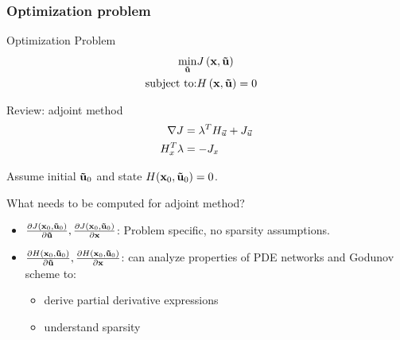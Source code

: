\begin{frame}[t]\frametitle{Optimization problem}
    

\begin{block}{Optimization Problem}
\begin{align}
\underset{\mathbf{\vec{u}}}{\min}&J\left(\mathbf{x},\mathbf{\vec{u}}\right)&\\\text{subject to:}&H\left(\mathbf{x},\mathbf{\vec{u}}\right)=0&
\end{align}
\end{block}

\begin{block}{Review: adjoint method}
\begin{align}
\nabla J & = \lambda^T H_{\vec{u}} + J_{\vec{u}} \\
H_{x}^T \lambda & = -J_{x}
\end{align}


\end{block}


\end{frame}

\begin{frame}


Assume initial $\mathbf{\vec{u}}_0$ and state $H(\mathbf{x}_0, \mathbf{\vec{u}}_0)=0$.
\begin{block}{What needs to be computed for adjoint method?}
\begin{itemize}
    \item $\frac{\partial J(\mathbf{x}_0, \mathbf{\vec{u}}_0)}{\partial\mathbf{\vec{u}}}, \frac{\partial J(\mathbf{x}_0, \mathbf{\vec{u}}_0)}{\partial\mathbf{x}}$: Problem specific, no sparsity assumptions.
    \item $\frac{\partial H(\mathbf{x}_0, \mathbf{\vec{u}}_0)}{\partial\mathbf{\vec{u}}}, \frac{\partial H(\mathbf{x}_0, \mathbf{\vec{u}}_0)}{\partial\mathbf{x}}$: can analyze properties of PDE networks and Godunov scheme to:
    \begin{itemize}
        \item derive partial derivative expressions
        \item understand sparsity
    \end{itemize}
\end{itemize}
\end{block}

\end{frame}

